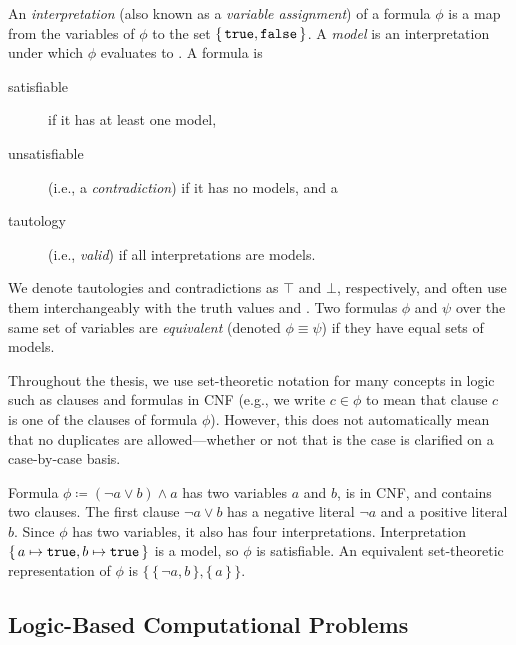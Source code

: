 An \emph{interpretation} (also known as a \emph{variable assignment}) of a
formula $\phi$ is a map from the variables of $\phi$ to the set
$\{\, \texttt{true}{}, \texttt{false}{} \,\}$. A \emph{model} is an interpretation under which
$\phi$ evaluates to \true{}. A formula is
\begin{description}
\item[satisfiable] if it has at least one model,
\item[unsatisfiable] (i.e., a \emph{contradiction}) if it has no models, and a
\item[tautology] (i.e., \emph{valid}) if all interpretations are models.
\end{description}
We denote tautologies and contradictions as $\top$ and $\bot$, respectively, and
often use them interchangeably with the truth values \true{} and \false{}. Two
formulas $\phi$ and $\psi$ over the same set of variables are \emph{equivalent}
(denoted $\phi \equiv \psi$) if they have equal sets of models.

Throughout the thesis, we use set-theoretic notation for many concepts in logic
such as clauses and formulas in CNF (e.g., we write $c \in \phi$ to mean that
clause $c$ is one of the clauses of formula $\phi$). However, this does not
automatically mean that no duplicates are allowed---whether or not that is the
case is clarified on a case-by-case basis.

\begin{example}\label{example:logic}
  Formula $\phi \coloneqq (\neg a \lor b) \land a$ has two variables $a$ and
  $b$, is in CNF, and contains two clauses. The first clause $\neg a \lor b$ has
  a negative literal $\neg a$ and a positive literal $b$. Since $\phi$ has two
  variables, it also has four interpretations. Interpretation
  $\{\, a \mapsto \texttt{true}{}, b \mapsto \texttt{true}{} \,\}$ is a model, so $\phi$ is
  satisfiable. An equivalent set-theoretic representation of $\phi$ is
  $\{\, \{\, \neg a, b \,\}, \{\, a \,\} \,\}$.
\end{example}


\subsection{Logic-Based Computational Problems}\label{sec:logicproblems}


